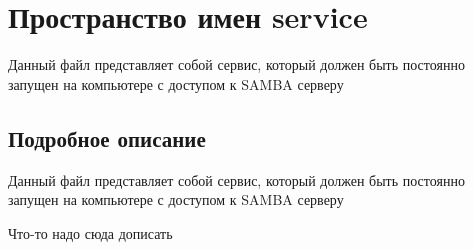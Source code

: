 \hypertarget{namespaceservice}{}\section{Пространство имен service}
\label{namespaceservice}


Данный файл представляет собой сервис, который должен быть постоянно запущен на компьютере с доступом к S\+A\+M\+BA серверу  




\subsection{Подробное описание}
Данный файл представляет собой сервис, который должен быть постоянно запущен на компьютере с доступом к S\+A\+M\+BA серверу 

Что-\/то надо сюда дописать 